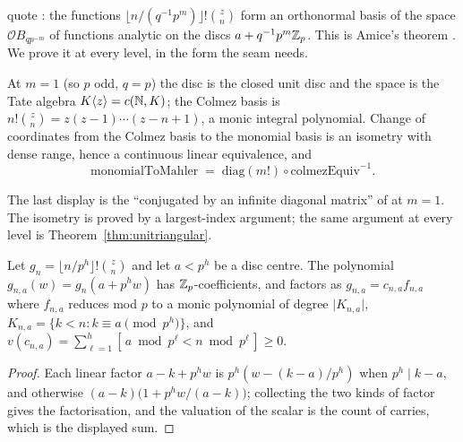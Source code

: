 \cite[\S2.16]{LWX} quote \cite[Th\'eor\`eme 1.29]{Colmez}: the functions
$\lfloor n/(q^{-1}p^{m})\rfloor!\binom{z}{n}$ form an orthonormal basis of the space
$\mathcal{O}B_{qp^{-m}}$ of functions analytic on the discs $a+q^{-1}p^{m}\mathbb{Z}_p$.  This is Amice's
theorem \cite{Amice}.  We prove it at every level, in the form the seam needs.

\begin{proposition}[Level $m=1$]
  \label{prop:colmez-m1}
  \leanok
  At $m=1$ (so $p$ odd, $q=p$) the disc is the closed unit disc and the space is the Tate algebra
  $K\langle z\rangle = c(\mathbb{N},K)$; the Colmez basis is
  $n!\binom{z}{n} = z(z-1)\cdots(z-n+1)$, a monic integral polynomial.  Change of coordinates
  from the Colmez basis to the monomial basis is an isometry with dense range, hence a continuous
  linear equivalence, and
  \[
    \mathrm{monomialToMahler} \;=\; \mathrm{diag}(m!)\circ\mathrm{colmezEquiv}^{-1} .
  \]
\end{proposition}

The last display is the ``conjugated by an infinite diagonal matrix'' of
\cite[proof of Proposition 2.17]{LWX} at $m=1$.  The isometry is proved by a largest-index
argument; the same argument at every level is Theorem~\ref{thm:unitriangular}.

\begin{lemma}
  \label{lem:colmez-valuation}
  \leanok
  Let $g_n = \lfloor n/p^{h}\rfloor!\binom{z}{n}$ and let $a < p^{h}$ be a disc centre.  The
  polynomial $g_{n,a}(w) = g_n(a+p^{h}w)$ has $\mathbb{Z}_p$-coefficients, and factors as
  $g_{n,a} = c_{n,a}f_{n,a}$ where $f_{n,a}$ reduces mod $p$ to a monic polynomial of degree
  $\lvert K_{n,a}\rvert$, $K_{n,a} = \{k<n : k\equiv a \pmod{p^{h}}\}$, and
  $v(c_{n,a}) = \sum_{\ell=1}^{h}[\,a \bmod p^{\ell} < n\bmod p^{\ell}\,] \geq 0$.
\end{lemma}

\begin{proof}
  \leanok
  Each linear factor $a-k+p^{h}w$ is $p^{h}(w-(k-a)/p^{h})$ when $p^{h}\mid k-a$, and otherwise
  $(a-k)\bigl(1+p^{h}w/(a-k)\bigr)$; collecting the two kinds of factor gives the factorisation,
  and the valuation of the scalar is the count of carries, which is the displayed sum.
\end{proof}

